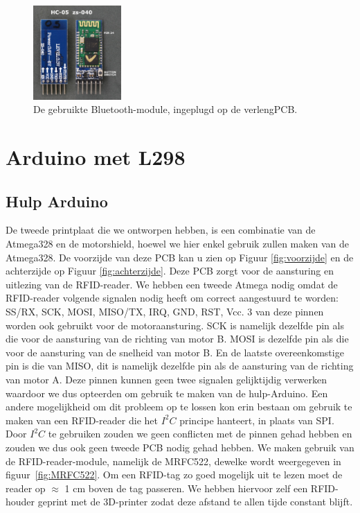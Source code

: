 \begin{figure}[h]
\centering
\includegraphics[width=0.3\textwidth]{HC05.jpg}
\caption{De gebruikte Bluetooth-module, ingeplugd op de verlengPCB.}
\label{fig:HC05}
\end{figure}
\section{Arduino met L298}
\subsection{Hulp Arduino}
De tweede printplaat die we ontworpen hebben, is een combinatie van de Atmega328 en de motorshield, hoewel we hier enkel gebruik zullen maken van de Atmega328. De voorzijde van deze PCB kan u zien op Figuur \ref{fig:voorzijde} en de achterzijde op Figuur \ref{fig:achterzijde}. Deze PCB zorgt voor de aansturing en uitlezing van de RFID-reader. We hebben een tweede Atmega nodig omdat de RFID-reader volgende signalen nodig heeft om correct aangestuurd te worden: SS/RX, SCK, MOSI, MISO/TX, IRQ, GND, RST, Vcc. 3 van deze pinnen worden ook gebruikt voor de motoraansturing. SCK is namelijk dezelfde pin als die voor de aansturing van de richting van motor B. MOSI is dezelfde pin als die voor de aansturing van de snelheid van motor B. En de laatste overeenkomstige pin is die van MISO, dit is namelijk dezelfde pin als de aansturing van de richting van motor A. Deze pinnen kunnen geen twee signalen gelijktijdig verwerken waardoor we dus opteerden om gebruik te maken van de hulp-Arduino. Een andere mogelijkheid om dit probleem op te lossen kon erin bestaan om gebruik te maken van een RFID-reader die het $I^{2}C$ principe hanteert, in plaats van SPI. Door $I^{2}C$ te gebruiken zouden we geen conflicten met de pinnen gehad hebben en zouden we dus ook geen tweede PCB nodig gehad hebben. We maken gebruik van de RFID-reader-module, namelijk de MRFC522, dewelke wordt weergegeven in figuur~\ref{fig:MRFC522}. Om een RFID-tag zo goed mogelijk uit te lezen moet de reader op $\approx$ 1 cm boven de tag passeren. We hebben hiervoor zelf een RFID-houder geprint met de 3D-printer zodat deze afstand te allen tijde constant blijft.

